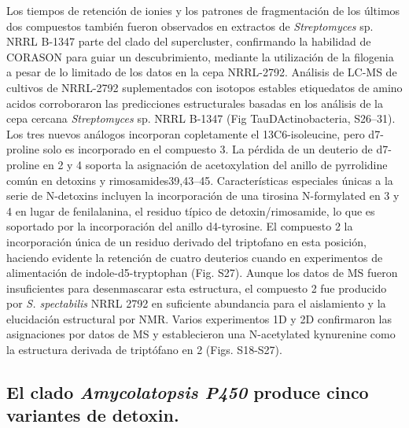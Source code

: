 \documentclass[12pt,twoside]{reedthesis}
\begin{document}
  Los tiempos de retención de ionies y los patrones de fragmentación de
  los últimos dos compuestos también fueron observados en extractos de
  \emph{Streptomyces} sp. NRRL B-1347 parte del clado del supercluster,
  confirmando la habilidad de CORASON para guiar un descubrimiento,
  mediante la utilización de la filogenia a pesar de lo limitado de los
  datos en la cepa NRRL-2792. Análisis de LC-MS de cultivos de NRRL-2792
  suplementados con isotopos estables etiquedatos de amino acidos
  corroboraron las predicciones estructurales basadas en los análisis de
  la cepa cercana \emph{Streptomyces} sp. NRRL B-1347 (Fig
  TauDActinobacteria, S26--31). Los tres nuevos análogos incorporan
  copletamente el 13C6-isoleucine, pero d7-proline solo es incorporado en
  el compuesto 3. La pérdida de un deuterio de d7-proline en 2 y 4 soporta
  la asignación de acetoxylation del anillo de pyrrolidine común en
  detoxins y rimosamides39,43--45. Características especiales únicas a la
  serie de N-detoxins incluyen la incorporación de una tirosina
  N-formylated en 3 y 4 en lugar de fenilalanina, el residuo típico de
  detoxin/rimosamide, lo que es soportado por la incorporación del anillo
  d4-tyrosine. El compuesto 2 la incorporación única de un residuo
  derivado del triptofano en esta posición, haciendo evidente la retención
  de cuatro deuterios cuando en experimentos de alimentación de
  indole-d5-tryptophan (Fig. S27). Aunque los datos de MS fueron
  insuficientes para desenmascarar esta estructura, el compuesto 2 fue
  producido por \emph{S. spectabilis} NRRL 2792 en suficiente abundancia
  para el aislamiento y la elucidación estructural por NMR. Varios
  experimentos 1D y 2D confirmaron las asignaciones por datos de MS y
  establecieron una N-acetylated kynurenine como la estructura derivada de
  triptófano en 2 (Figs. S18-S27).
  
  \subsection{\texorpdfstring{El clado \emph{Amycolatopsis P450} produce
  cinco variantes de
  detoxin.}{El clado Amycolatopsis P450 produce cinco variantes de detoxin.}}\label{el-clado-amycolatopsis-p450-produce-cinco-variantes-de-detoxin.}
  
\end{document}
